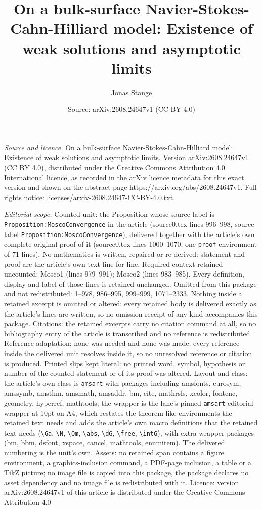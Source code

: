 \documentclass[10pt,a4paper]{amsart}
\title[On a bulk-surface Navier-Stokes-Cahn-Hilliard model: Existen]{On a bulk-surface Navier-Stokes-Cahn-Hilliard model: Existence of weak solutions and asymptotic limits}
\author{Jonas Stange}
\date{Source: arXiv:2608.24647v1 (CC BY 4.0)}
\begin{document}
\maketitle

\noindent\emph{Source and licence.} On a bulk-surface Navier-Stokes-Cahn-Hilliard model: Existence of weak solutions and asymptotic limits. Version arXiv:2608.24647v1 (CC BY 4.0), distributed under the Creative Commons Attribution 4.0 International licence, as recorded in the arXiv licence metadata for this exact version and shown on the abstract page https://arxiv.org/abs/2608.24647v1. Full rights notice: licenses/arxiv-2608.24647-CC-BY-4.0.txt.\par\smallskip

\noindent\textit{Editorial scope.} Counted unit: the Proposition whose source label is \texttt{Proposition:MoscoConvergence} in the article (source0.tex lines 996--998, source label \texttt{Proposition:MoscoConvergence}), delivered together with the article's own complete original proof of it (source0.tex lines 1000--1070, one \texttt{proof} environment of 71 lines). No mathematics is written, repaired or re-derived: statement and proof are the article's own text line for line. Required context retained uncounted: Mosco1 (lines 979--991); Mosco2 (lines 983--985). Every definition, display and label of those lines is retained unchanged. Omitted from this package and not redistributed: 1--978, 986--995, 999--999, 1071--2333. Nothing inside a retained excerpt is omitted or altered: every retained body is delivered exactly as the article's lines are written, so no omission receipt of any kind accompanies this package. Citations: the retained excerpts carry no citation command at all, so no bibliography entry of the article is transcribed and no reference is redistributed. Reference adaptation: none was needed and none was made; every reference inside the delivered unit resolves inside it, so no unresolved reference or citation is produced. Printed slips kept literal: no printed word, symbol, hypothesis or number of the counted statement or of its proof was altered. Layout and class: the article's own class is \texttt{amsart} with packages including amsfonts, eurosym, amssymb, amsthm, amsmath, amsaddr, bm, cite, mathrsfs, xcolor, fontenc, geometry, hyperref, mathtools; the wrapper is the lane's pinned \texttt{amsart} editorial wrapper at 10pt on A4, which restates the theorem-like environments the retained text needs and adds the article's own macro definitions that the retained text needs (\texttt{\textbackslash Ga}, \texttt{\textbackslash N}, \texttt{\textbackslash Om}, \texttt{\textbackslash abs}, \texttt{\textbackslash dG}, \texttt{\textbackslash free}, \texttt{\textbackslash intG}), with extra wrapper packages (bm, bbm, dsfont, xspace, cancel, mathtools, enumitem). The delivered numbering is the unit's own. Assets: no retained span contains a figure environment, a graphics-inclusion command, a PDF-page inclusion, a table or a TikZ picture; no image file is copied into this package, the package declares no asset dependency and no image file is redistributed with it. Licence: version arXiv:2608.24647v1 of this article is distributed under the Creative Commons Attribution 4.0 
\end{document}
